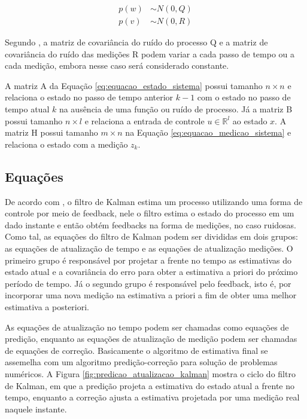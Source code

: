 \documentclass[acronym, symbols]{fei}
\begin{document}
			\begin{equation} \label{eq:equacao_probabilidade_variaveis_ruido}
				\begin{split}
					p(w) &\sim N(0, Q) \\
					p(v) &\sim N(0, R)
				\end{split}
			\end{equation}
		
			Segundo \textcite{welch1995introduction}, a matriz de covariância do ruído do processo Q e a matriz de covariância do ruído das medições R podem variar a cada passo de tempo ou a cada medição, embora nesse caso será considerado constante.
			
			A matriz A da Equação \eqref{eq:equacao_estado_sistema} possui tamanho $n \times n$ e relaciona o estado no passo de tempo anterior $k - 1$ com o estado no passo de tempo atual $k$ na ausência de uma função ou ruído de processo. Já a matriz B possui tamanho $n \times l$ e relaciona a entrada de controle $u \in \mathbb{R}^l$ ao estado $x$. A matriz H possui tamanho $m \times n$ na Equação \eqref{eq:equacao_medicao_sistema} e relaciona o estado com a medição $z_k$.
			
		\subsection{Equações}
			
			De acordo com \textcite{welch1995introduction}, o filtro de Kalman estima um processo utilizando uma forma de controle por meio de feedback, nele o filtro estima o estado do processo em um dado instante e então obtém feedbacks na forma de medições, no caso ruidosas. Como tal, as equações do filtro de Kalman podem ser divididas em dois grupos: as equações de atualização de tempo e as equações de atualização medições. O primeiro grupo é responsável por projetar a frente no tempo as estimativas do estado atual e a covariância do erro para obter a estimativa a priori do próximo período de tempo. Já o segundo grupo é responsável pelo feedback, isto é, por incorporar uma nova medição na estimativa a priori a fim de obter uma melhor estimativa a posteriori.
			
			As equações de atualização no tempo podem ser chamadas como equações de predição, enquanto as equações de atualização de medição podem ser chamadas de equações de correção. Basicamente o algoritmo de estimativa final se assemelha com um algoritmo predição-correção para solução de problemas numéricos. A Figura \ref{fig:predicao_atualizacao_kalman} mostra o ciclo do filtro de Kalman, em que a predição projeta a estimativa do estado atual a frente no tempo, enquanto a correção ajusta a estimativa projetada por uma medição real naquele instante.
			
\end{document}
